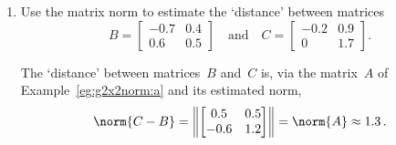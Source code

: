 \begin{example} \label{eg:}
\begin{enumerate}
\item Use the matrix norm to estimate the `distance' between matrices
\begin{equation*}
B=\begin{bmatrix} {-0.7}&{0.4}\\{0.6}&{0.5} \end{bmatrix}
\quad\text{and}\quad
C=\begin{bmatrix} -0.2&0.9\\0&1.7 \end{bmatrix}.
\end{equation*}
\begin{solution} 
The `distance' between matrices~\(B\) and~\(C\) is, via the matrix~\(A\) of Example~\ref{eg:g2x2norm:a} and its estimated norm,
\begin{equation*}
\norm{C-B}=\left\|\begin{bmatrix} 0.5&0.5\\-0.6&1.2 \end{bmatrix}\right\|
=\norm{A}\approx 1.3\,.
\end{equation*} 
\end{solution}



\end{enumerate}
\end{example}

